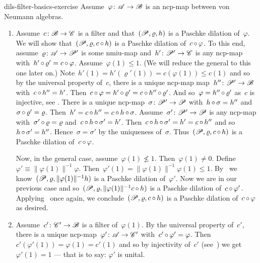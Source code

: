 \begin{solution}{dils-filter-basics-exercise}%
    Assume~$\varphi\colon \mathscr{A} \to \mathscr{B}$ is an ncp-map between
        von Neumann algebras.
\begin{enumerate}
\item
    Assume~$c\colon \mathscr{B} \to \mathscr{C}$ is a filter
            and that~$(\mathscr{P}, \varrho, h)$ is a Paschke dilation of~$\varphi$.
    We will show that~$(\mathscr{P}, \varrho, c \mathop{\circ} h)$ is a Paschke
        dilation of~$c \mathop{\circ} \varphi$.
    To this end, assume~$\varrho\colon \mathscr{A} \to \mathscr{P}'$ is some nmiu-map
            and~$h'\colon \mathscr{P}' \to \mathscr{C}$ is any ncp-map
            with~$h' \mathop{\circ} \varrho' = c \mathop{\circ} \varphi$.
    Assume~$\varphi(1) \leq 1$.
        (We will reduce the general to this one later on.)
        Note~$h'(1) = h'(\varrho'(1)) = c(\varphi(1)) \leq c(1)$
            and so by the universal property of~$c$,
            there is a unique ncp-map map~$h''\colon \mathscr{P}' \to \mathscr{B}$
                with~$c \mathop{\circ} h'' = h'$.
    Then~$c \mathop{\circ} \varphi = h' \mathop{\circ} \varrho' =
             c \mathop{\circ} h'' \mathop{\circ} \varrho'$.
    And so~$\varphi = h'' \mathop{\circ} \varrho'$
        as~$c$ is injective, see .
    There is a unique ncp-map~$\sigma\colon \mathscr{P}' \to \mathscr{P}$
            with~$h \mathop{\circ} \sigma = h''$
                and~$\sigma \mathop{\circ} \varrho' =\varrho$.
Then~$h' = c \mathop{\circ} h'' = c \mathop{\circ} h \mathop{\circ} \sigma$.
Assume~$\sigma'\colon \mathscr{P}'\to \mathscr{P}$
    is any ncp-map with~$\sigma' \mathop{\circ} \varrho = \varrho$
            and~$c \mathop{\circ} h \mathop{\circ} \sigma' = h'$.
Then~$c \mathop{\circ} h \mathop{\circ} \sigma' = h' = c \mathop{\circ} h''$
    and so~$h \mathop{\circ} \sigma' = h''$.
    Hence~$\sigma=\sigma'$ by the uniqueness of~$\sigma$.
Thus~$(\mathscr{P}, \varrho, c\mathop{\circ} h)$ is a Paschke dilation of~$c\mathop{\circ}\varphi$.

    Now, in the general case, assume~$\varphi(1) \nleq 1$.
    Then~$\varphi(1) \neq 0$.
        Define~$\varphi' \equiv \|\varphi(1)\|^{-1} \varphi$.
        Then~$\varphi'(1) = \|\varphi(1)\|^{-1} \varphi(1) \leq 1$.
        By~
         we know~$(\mathscr{P}, \varrho, \|\varphi(1)\|^{-1} h)$
            is a Paschke dilation of~$\varphi'$.
    Now we are in our previous case
        and so~$(\mathscr{P}, \varrho, \|\varphi(1)\|^{-1} c \mathop{\circ} h)$
            is a Paschke dilation of~$c \mathop{\circ} \varphi'$.
    Applying~ once again,
            we conclude~$(\mathscr{P}, \varrho,c \mathop{\circ} h)$
        is a Paschke dilation of~$c \mathop{\circ} \varphi$ as desired.
\item
Assume~$c' \colon \mathscr{C}' \to \mathscr{B}$ is a filter of~$\varphi(1)$.
By the universal property of~$c'$,
    there is a unique ncp-map~$\varphi'\colon \mathscr{A} \to \mathscr{C}'$
            with~$c'\mathop{\circ} \varphi' = \varphi$.
Then~$c'(\varphi'(1)) = \varphi(1) = c'(1)$
        and so by injectivity of~$c'$ (see~)
            we get~$\varphi'(1) = 1$ ---
            that is to say: $\varphi'$ is unital.


\end{enumerate}
\end{solution}
